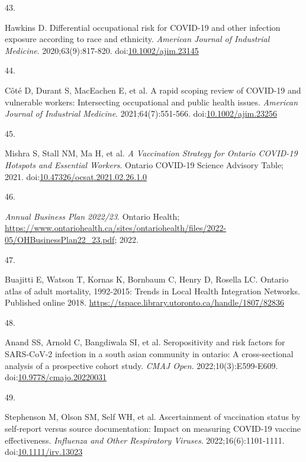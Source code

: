 \documentclass[
  letterpaper,
  DIV=11,
  numbers=noendperiod]{scrartcl}
\newlength{\cslhangindent}
\newlength{\csllabelwidth}
\newlength{\cslentryspacingunit} %
\newenvironment{CSLReferences}[2] %
 {%
  \setlength{\parindent}{0pt}
  \ifodd #1
  \let\oldpar\par
  \def\par{\hangindent=\cslhangindent\oldpar}
  \fi
  \setlength{\parskip}{#2\cslentryspacingunit}
 }%
 {}
\newcommand{\CSLLeftMargin}[1]{\parbox[t]{\csllabelwidth}{#1}}
\newcommand{\CSLRightInline}[1]{\parbox[t]{\linewidth - \csllabelwidth}{#1}\break}
\begin{document}
\begin{CSLReferences}{0}{0}
\leavevmode{}%
\CSLLeftMargin{43. }%
\CSLRightInline{Hawkins D. Differential occupational risk for {COVID}-19
and other infection exposure according to race and ethnicity.
\emph{American Journal of Industrial Medicine}. 2020;63(9):817-820.
doi:\href{https://doi.org/10.1002/ajim.23145}{10.1002/ajim.23145}}

\leavevmode{}%
\CSLLeftMargin{44. }%
\CSLRightInline{Côté D, Durant S, MacEachen E, et al. A rapid scoping
review of {COVID}-19 and vulnerable workers: Intersecting occupational
and public health issues. \emph{American Journal of Industrial
Medicine}. 2021;64(7):551-566.
doi:\href{https://doi.org/10.1002/ajim.23256}{10.1002/ajim.23256}}

\leavevmode{}%
\CSLLeftMargin{45. }%
\CSLRightInline{Mishra S, Stall NM, Ma H, et al. \emph{A Vaccination
Strategy for Ontario {COVID}-19 Hotspots and Essential Workers}. Ontario
{COVID}-19 Science Advisory Table; 2021.
doi:\href{https://doi.org/10.47326/ocsat.2021.02.26.1.0}{10.47326/ocsat.2021.02.26.1.0}}

\leavevmode{}%
\CSLLeftMargin{46. }%
\CSLRightInline{\emph{{A}nnual {B}usiness {P}lan 2022/23}. Ontario
Health;
\url{https://www.ontariohealth.ca/sites/ontariohealth/files/2022-05/OHBusinessPlan22_23.pdf};
2022.}

\leavevmode{}%
\CSLLeftMargin{47. }%
\CSLRightInline{Buajitti E, Watson T, Kornas K, Bornbaum C, Henry D,
Rosella LC. Ontario atlas of adult mortality, 1992-2015: Trends in
{L}ocal {H}ealth {I}ntegration {N}etworks. Published online 2018.
\url{https://tspace.library.utoronto.ca/handle/1807/82836}}

\leavevmode{}%
\CSLLeftMargin{48. }%
\CSLRightInline{Anand SS, Arnold C, Bangdiwala SI, et al. Seropositivity
and risk factors for {SARS}-{CoV}-2 infection in a south asian community
in ontario: A cross-sectional analysis of a prospective cohort study.
\emph{{CMAJ} Open}. 2022;10(3):E599-E609.
doi:\href{https://doi.org/10.9778/cmajo.20220031}{10.9778/cmajo.20220031}}

\leavevmode{}%
\CSLLeftMargin{49. }%
\CSLRightInline{Stephenson M, Olson SM, Self WH, et al. Ascertainment of
vaccination status by self-report versus source documentation: Impact on
measuring {COVID}-19 vaccine effectiveness. \emph{Influenza and Other
Respiratory Viruses}. 2022;16(6):1101-1111.
doi:\href{https://doi.org/10.1111/irv.13023}{10.1111/irv.13023}}

\end{CSLReferences}
\end{document}
